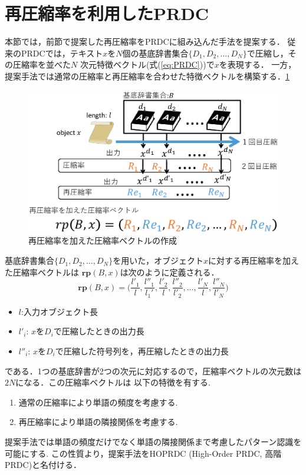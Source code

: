 \section{再圧縮率を利用したPRDC}
本節では，前節で提案した再圧縮率をPRDCに組み込んだ手法を提案する．
従来のPRDCでは，テキスト$x$を$N$個の基底辞書集合$\{D_1,D_2,\dots,D_N\}$で圧縮し，その圧縮率を並べた$N$
次元特徴ベクトル(式(\ref{eq:PRDC}))で$x$を表現する．
一方，提案手法では通常の圧縮率と再圧縮率を合わせた特徴ベクトルを構築する．\ref{fig:HOPRDC.eps}

\begin{figure}[tb]
\centering
\includegraphics[clip, width=\columnwidth]{image/HOPRDC.eps}
\caption{再圧縮率を加えた圧縮率ベクトルの作成}
\label{fig:HOPRDC.eps}
\end{figure}

基底辞書集合$\{D_1,D_2,\dots,D_N\}$を用いた，オブジェクト$x$に対する再圧縮率を加えた圧縮率ベクトルは
$\boldsymbol{rp}(B,x)$は次のように定義される．
\begin{equation}
\boldsymbol{rp}(B,x) = \biggl(\frac{l'_1}{l}, \frac{l''_1}{l_1'}, \frac{l'_2}{l}, \frac{l''_2}{l'_2}, \dots, \frac{l'_N}{l}, \frac{l''_N}{l'_N} \biggr)
\end{equation}
\begin{itemize}
	\item $l $:入力オブジェクト長
	\item $l'_i$: $x$を$D_i$で圧縮したときの出力長
	\item $l''_i$: $x$を$D_i$で圧縮した符号列を，再圧縮したときの出力長
\end{itemize}
である．1つの基底辞書が2つの次元に対応するので，圧縮率ベクトルの次元数は$2N$になる．この圧縮率ベクトルは
以下の特徴を有する.
\begin{enumerate}
	\item 通常の圧縮率により単語の頻度を考慮する.
	\item 再圧縮率により単語の隣接関係を考慮する.
\end{enumerate}
提案手法では単語の頻度だけでなく単語の隣接関係まで考慮したパターン認識を可能にする.
この性質より，提案手法をHOPRDC (High-Order PRDC, 高階PRDC)と名付ける．


